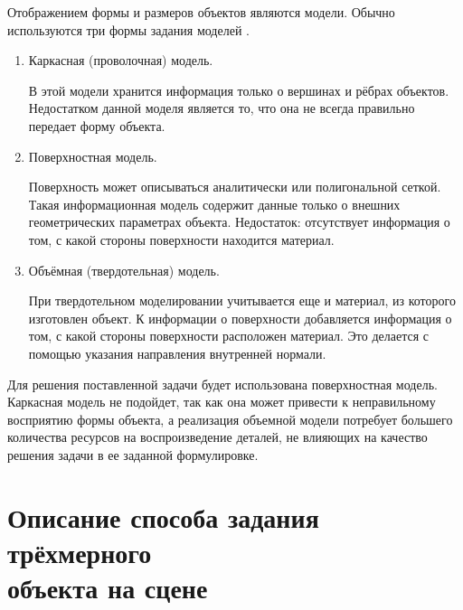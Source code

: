 Отображением формы и размеров объектов являются модели. Обычно
используются три формы задания моделей \cite{kurov}.
\begin{enumerate}[label=\arabic*)]
	\item Каркасная (проволочная) модель. 
	
	В этой модели хранится информация только о вершинах и рёбрах объектов. Недостатком данной моделя является то, что она не всегда правильно передает форму объекта.
	\item Поверхностная модель.
	
	Поверхность может описываться аналитически или полигональной сеткой. Такая информационная модель содержит данные только о внешних геометрических параметрах объекта. Недостаток: отсутствует информация о том, с какой стороны поверхности находится материал.

	\item Объёмная (твердотельная) модель.
	
	При твердотельном моделировании учитывается еще и материал, из которого изготовлен объект. К информации о поверхности добавляется информация о том, с какой стороны поверхности расположен материал. Это делается с помощью указания направления внутренней нормали.
\end{enumerate}

Для решения поставленной задачи будет использована поверхностная модель. Каркасная модель не подойдет, так как она может привести к неправильному восприятию формы объекта, а реализация
объемной модели потребует большего количества ресурсов на воспроизведение деталей, не влияющих на качество решения задачи в ее заданной формулировке. 

\section{Описание способа задания трёхмерного \\объекта на сцене}

